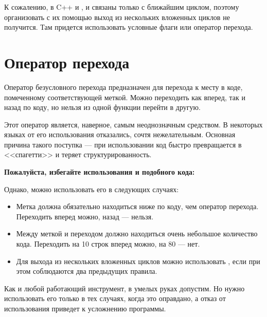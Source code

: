 \documentclass[book.tex]{subfiles}
\begin{document}

К сожалению, в C++ и , и  связаны только с ближайшим циклом, поэтому организовать с их помощью выход из нескольких вложенных циклов не получится. Там придется использовать условные флаги или оператор перехода.

\section*{Оператор перехода}

Оператор безусловного перехода  предназначен для перехода к месту в коде, помеченному соответствующей меткой. Можно переходить как вперед, так и назад по коду, но нельзя из одной функции перейти в другую.

Этот оператор является, наверное, самым неоднозначным средством. В некоторых языках от его использования отказались, сочтя нежелательным. Основная причина такого поступка --- при использовании  код быстро превращается в <<спагетти>> и теряет структурированность. 

\textbf{Пожалуйста, избегайте использования  и подобного кода:}


Однако, можно использовать его в следующих случаях:

\begin{itemize}
\item Метка должна обязательно находиться ниже по коду, чем оператор перехода. Переходить вперед можно, назад --- нельзя.
\item Между меткой и переходом должно находиться очень небольшое количество кода. Переходить на 10 строк вперед можно, на 80 --- нет.
\item Для выхода из нескольких вложенных циклов можно использовать , если при этом соблюдаются два предыдущих правила.
\end{itemize}


Как и любой работающий инструмент, в умелых руках  допустим. Но нужно использовать его только в тех случаях, когда это оправдано, а отказ от использования приведет к усложнению программы.
\end{document}
